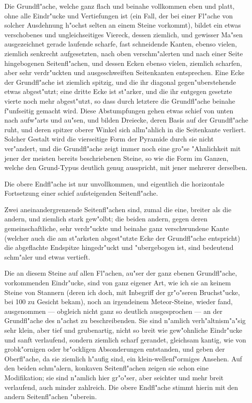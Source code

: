 \documentclass[a4paper, 11pt, oneside, german]{article}
\begin{document}
Die Grundfl"ache, welche ganz flach und beinahe vollkommen eben und platt, ohne alle Eindr"ucke und Vertiefungen ist (ein Fall, der bei einer Fl"ache von solcher Ausdehnung h"ochst selten an einem Steine vorkommt), bildet ein etwas verschobenes und ungleichseitiges Viereck, dessen ziemlich, und gewisser Ma"sen ausgezeichnet gerade laufende scharfe, fast schneidende Kanten, ebenso vielen, ziemlich senkrecht aufgesetzten, nach oben verschm"alerten und nach einer Seite hingebogenen Seitenfl"achen, und dessen Ecken ebenso vielen, ziemlich scharfen, aber sehr verdr"uckten und ausgeschweiften Seitenkanten entsprechen. Eine Ecke der Grundfl"ache ist ziemlich spitzig, und die ihr diagonal gegen"uberstehende etwas abgest"utzt; eine dritte Ecke ist st"arker, und die ihr entgegen gesetzte vierte noch mehr abgest"utzt, so dass durch letztere die Grundfl"ache beinahe f"unfseitig gemacht wird. Diese Abstumpfungen gehen etwas schief von unten nach aufw"arts und au"sen, und bilden Dreiecke, deren Basis auf der Grundfl"ache ruht, und deren spitzer oberer Winkel sich allm"ahlich in die Seitenkante verliert. Solcher Gestalt wird die vierseitige Form der Pyramide durch sie nicht ver"andert, und die Grundfl"ache zeigt immer noch eine gro"se "Ahnlichkeit mit jener der meisten bereits beschriebenen Steine, so wie die Form im Ganzen, welche den Grund-Typus deutlich genug ausspricht, mit jener mehrerer derselben.

Die obere Endfl"ache ist nur unvollkommen, und eigentlich die horizontale Fortsetzung einer schief aufsteigenden Seitenfl"ache.

Zwei aneinandergrenzende Seitenfl"achen sind, zumal die eine, breiter als die andern, und ziemlich stark gew"olbt; die beiden andern, gegen deren gemeinschaftliche, sehr verdr"uckte und beinahe ganz verschwundene Kante (welcher auch die am st"arksten abgest"utzte Ecke der Grundfl"ache entspricht) die abgeflachte Endspitze hingedr"uckt und "ubergebogen ist, sind bedeutend schm"aler und etwas vertieft.

Die an diesem Steine auf allen Fl"achen, au"ser der ganz ebenen Grundfl"ache, vorkommenden Eindr"ucke, sind von ganz eigener Art, wie ich sie an keinem Steine von Stannern (deren ich doch, mit Inbegriff der gr"o"seren Bruchst"ucke, bei 100 zu Gesicht bekam), noch an irgendeinem Meteor-Steine, wieder fand, ausgenommen --- obgleich nicht ganz so deutlich ausgesprochen --- an der Grundfl"ache des n"achst zu beschreibenden. Sie sind n"amlich verh"altnism"a"sig sehr klein, aber tief und grubenartig, nicht so breit wie gew"ohnliche Eindr"ucke und sanft verlaufend, sondern ziemlich scharf gerandet, gleichsam kantig, wie von grobk"ornigen oder br"ockligen Absonderungen entstanden, und geben der Oberfl"ache, da sie ziemlich h"aufig sind, ein klein-wellenf"ormiges Ansehen. Auf den beiden schm"alern, konkaven Seitenfl"achen zeigen sie schon eine Modifikation; sie sind n"amlich hier gr"o"ser, aber seichter und mehr breit verlaufend, auch minder zahlreich. Die obere Endfl"ache stimmt hierin mit den andern Seitenfl"achen "uberein.
\end{document}
